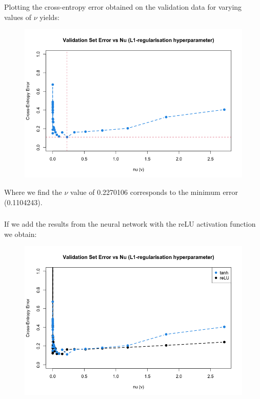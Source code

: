 \documentclass[12pt]{article}
\begin{document}
\subsubsection{}

Plotting the cross-entropy error obtained on the validation data for varying values of $\nu$ yields:

\begin{figure}[!ht]
\center
\includegraphics[width=\textwidth,height=0.5\textheight]{question_c_plot.png}
\end{figure}

Where we find the $\nu$ value of 0.2270106 corresponds to the minimum error (0.1104243).

\subsubsection{}
If we add the results from the neural network with the reLU activation function we obtain:

\begin{figure}[!ht]
\center
\includegraphics[width=\textwidth,height=0.5\textheight]{question_d_plot.png}
\end{figure}

\subsubsection{}
\subsubsection{}
\end{document}
